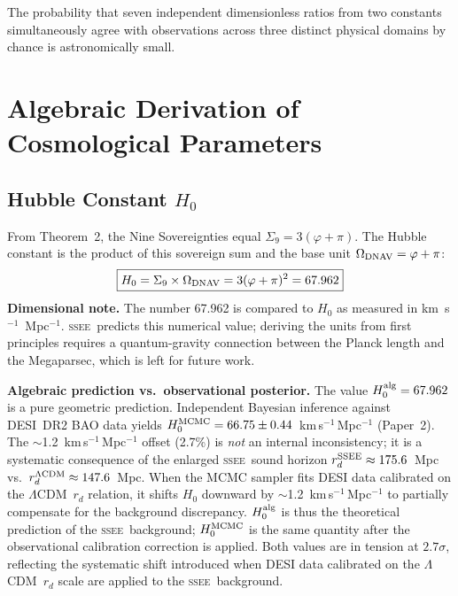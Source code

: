 \documentclass[12pt,a4paper]{article}
\newcommand{\SSEE}{\ifmmode\mathrm{SSEE}\else\textsc{ssee}\fi}
\newcommand{\LCDM}{\ifmmode\Lambda\mathrm{CDM}\else$\Lambda$CDM\fi}
\begin{document}
The probability that seven independent dimensionless ratios from two
constants simultaneously agree with observations across three distinct
physical domains by chance is astronomically small.

\section{Algebraic Derivation of Cosmological Parameters}
\label{sec:derivations}

\subsection{Hubble Constant \texorpdfstring{$H_0$}{H0}}
\label{sec:h0}

From Theorem~2, the Nine Sovereignties equal $\Sigma_9 = 3(\varphi+\pi)$.
The Hubble constant is the product of this sovereign sum and the base unit
$\Omega_{\rm DNAV} = \varphi+\pi$:
\begin{equation}
\boxed{H_0 = \Sigma_9 \times \Omega_{\rm DNAV} = 3(\varphi+\pi)^2 = 67.962}
\label{eq:H0}
\end{equation}
\textbf{Dimensional note.} The number 67.962 is compared to $H_0$ as measured
in km~s$^{-1}$~Mpc$^{-1}$.  \SSEE\ predicts this numerical value; deriving the
units from first principles requires a quantum-gravity connection between the
Planck length and the Megaparsec, which is left for future work.

\textbf{Algebraic prediction vs.\ observational posterior.}
The value $H_0^{\rm alg}=67.962$ is a pure geometric prediction.
Independent Bayesian inference against DESI~DR2 BAO data yields
$H_0^{\rm MCMC}=66.75\pm0.44$~km\,s$^{-1}$\,Mpc$^{-1}$ (Paper~2).
The $\sim$1.2~km\,s$^{-1}$\,Mpc$^{-1}$ offset (2.7\%) is \emph{not} an
internal inconsistency; it is a systematic consequence of the enlarged
\SSEE\ sound horizon $r_d^{\rm SSEE}\approx175.6$~Mpc vs.\
$r_d^{\rm \Lambda CDM}\approx147.6$~Mpc.
When the MCMC sampler fits DESI data calibrated on the \LCDM\ $r_d$
relation, it shifts $H_0$ downward by $\sim$1.2~km\,s$^{-1}$\,Mpc$^{-1}$
to partially compensate for the background discrepancy.
$H_0^{\rm alg}$ is thus the theoretical prediction of the \SSEE\ background;
$H_0^{\rm MCMC}$ is the same quantity after the observational calibration
correction is applied.
Both values are in tension at $2.7\sigma$, reflecting the systematic shift introduced when DESI data calibrated on the \LCDM\ $r_d$ scale are applied to the \SSEE\ background.
\end{document}
